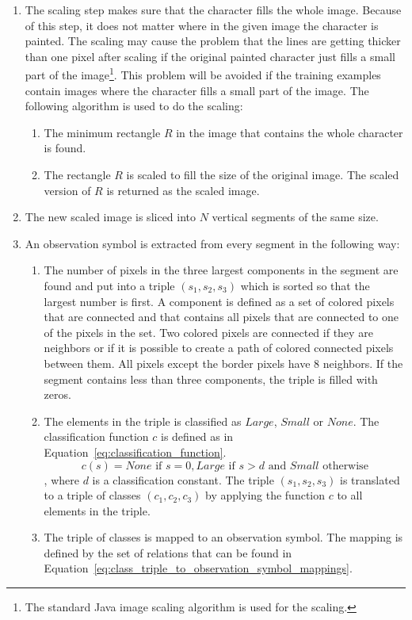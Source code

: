 \begin{enumerate}
  \item The scaling step makes sure that the character fills the whole image. Because of this step, it does not matter where in the given image the character is painted. 
  The scaling may cause the problem that the lines are getting thicker than one pixel after scaling if the original painted character just fills a small part of the image\footnote{The standard Java image scaling algorithm is used for the scaling.}. 
  This problem will be avoided if the training examples contain images where the character fills a small part of the image. The following algorithm is used to do the scaling:
  \begin{enumerate}
    \item The minimum rectangle $R$ in the image that contains the whole character is found.
    \item The rectangle $R$ is scaled to fill the size of the original image. The scaled version of $R$ is returned as the scaled image.
  \end{enumerate}
  \item The new scaled image is sliced into $N$ vertical segments of the same size.
  \item An observation symbol is extracted from every segment in the following way:
  \begin{enumerate}
    \item The number of pixels in the three largest components in the segment are found and put into a triple $(s_{1},s_{2},s_{3})$ which is sorted so that the largest number is first. A component is defined as a set of colored pixels that are connected and that contains all pixels that are connected to one of the pixels in the set. Two colored pixels are connected if they are neighbors or if it is possible to create a path of colored connected pixels between them. All pixels except the border pixels have 8 neighbors. If the segment contains less than three components, the triple is filled with zeros.
    \item The elements in the triple is classified as $Large$, $Small$ or $None$. The classification function $c$ is defined as in Equation~\ref{eq:classification_function}.
    \begin{equation}\label{eq:classification_function}
    c(s) = None \text{ if } s = 0, Large \text{ if } s > d \text{ and } Small \text{ otherwise}
    \end{equation}, where $d$ is a classification constant. The triple $(s_{1},s_{2},s_{3})$ is translated to a triple of classes $(c_{1},c_{2},c_{3})$ by applying the function $c$ to all elements in the triple.
    \item The triple of classes is mapped to an observation symbol. The mapping is defined by the set of relations that can be found in Equation~\ref{eq:class_triple_to_observation_symbol_mappings}.


\end{enumerate}
\end{enumerate}
